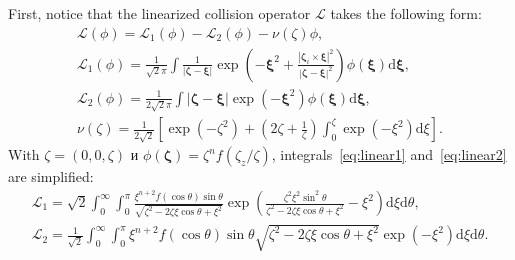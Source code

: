 \documentclass[review]{elsarticle}
\newcommand{\dd}{\mathrm{d}}
\newcommand{\dxi}{\boldsymbol{\dd\xi}}
\newcommand{\bzeta}{\boldsymbol{\zeta}}
\newcommand{\bxi}{\boldsymbol{\xi}}
\begin{document}
First, notice that the linearized collision operator \(\mathcal{L}\) takes the following form:
\begin{gather}
    \mathcal{L}(\phi) = \mathcal{L}_1(\phi) - \mathcal{L}_2(\phi) - \nu(\zeta)\phi, \label{eq:linear_canonic}\\[6pt]
    \mathcal{L}_1(\phi) = \frac1{\sqrt2\pi} \int \frac1{|\bzeta-\bxi|}
        \exp\left(-\bxi^2 + \frac{|\bzeta_i\times\bxi|^2}{|\bzeta-\bxi|^2}\right) \phi(\bxi) \dxi, \label{eq:linear1}\\
    \mathcal{L}_2(\phi) = \frac1{2\sqrt2\pi} \int |\bzeta-\bxi|\exp\left(-\bxi^2\right) \phi(\bxi) \dxi, \label{eq:linear2}\\
    \nu(\zeta) = \frac1{2\sqrt2}\left[ \exp\left(-\zeta^2\right) + \left(2\zeta+\frac1\zeta\right)
        \int_0^\zeta\exp\left(-\xi^2\right)\dd\xi \right]. \label{eq:linear_nu}
\end{gather}
With \(\zeta=(0,0,\zeta)\) и \(\phi(\bzeta) = \zeta^n f(\zeta_z/\zeta)\),
integrals~\eqref{eq:linear1} and~\eqref{eq:linear2} are simplified:
\begin{gather}
    \mathcal{L}_1 = \sqrt2 \int_0^\infty \int_0^\pi
        \frac{\xi^{n+2}f(\cos\theta)\sin\theta}{\sqrt{\zeta^2-2\zeta\xi\cos\theta+\xi^2}}
        \exp\left( \frac{\zeta^2\xi^2\sin^2\theta}{\zeta^2-2\zeta\xi\cos\theta+\xi^2} -\xi^2 \right)
        \dd\xi\dd\theta, \label{eq:linear1_sph}\\
    \mathcal{L}_2 = \frac1{\sqrt2} \int_0^\infty \int_0^\pi
        \xi^{n+2}f(\cos\theta)\sin\theta\sqrt{\zeta^2-2\zeta\xi\cos\theta+\xi^2}
        \exp\left(-\xi^2\right) \dd\xi\dd\theta. \label{eq:linear2_sph}
\end{gather}
\end{document}
